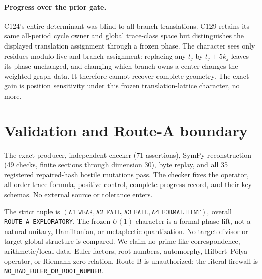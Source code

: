 \documentclass[10pt]{article}
\begin{document}
\paragraph{Progress over the prior gate.}
C124's entire determinant was blind to all branch translations.  C129 retains
its same all-period cycle owner and global trace-class space but distinguishes
the displayed translation assignment through a frozen phase.  The character
sees only residues modulo five and branch assignment: replacing any $t_j$ by
$t_j+5k_j$ leaves its phase unchanged, and changing which branch owns a center
changes the weighted graph data.  It therefore cannot recover complete
geometry.  The exact gain is position sensitivity under this frozen
translation-lattice character, no more.

\section{Validation and Route-A boundary}
The exact producer, independent checker (71 assertions), SymPy reconstruction
(49 checks, finite sections through dimension 30), byte replay, and all 35
registered repaired-hash hostile mutations pass.  The checker fixes the
operator, all-order trace formula, positive control, complete progress record,
and their key schemas.  No external source or tolerance enters.

The strict tuple is $(\texttt{A1\_WEAK},\texttt{A2\_FAIL},
\texttt{A3\_FAIL},\texttt{A4\_FORMAL\_HINT})$, overall
\texttt{ROUTE\_A\_EXPLORATORY}.  The frozen $U(1)$ character is a formal phase
lift, not a natural unitary, Hamiltonian, or metaplectic quantization.  No
target divisor or target global structure is compared.  We claim no prime-like
correspondence, arithmetic/local data, Euler factors, root numbers, automorphy,
Hilbert--P\'olya operator, or Riemann-zero relation.  Route B is unauthorized;
the literal firewall is \texttt{NO\_BAD\_EULER\_OR\_ROOT\_NUMBER}.
\end{document}
